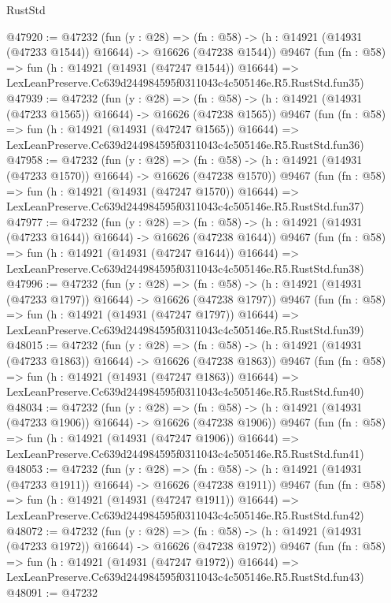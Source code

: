 \begin{lexlean}{RustStd}
\begin{coremodule}
@47920 := @47232
    (fun (y : @28) =>
    (fn : @58) -> (h : @14921 (@14931 (@47233 @1544)) @16644) -> @16626 (@47238 @1544))
    @9467
    (fun (fn : @58) =>
    fun (h : @14921 (@14931 (@47247 @1544)) @16644) =>
    LexLeanPreserve.Cc639d244984595f0311043c4c505146e.R5.RustStd.fun35)
@47939 := @47232
    (fun (y : @28) =>
    (fn : @58) -> (h : @14921 (@14931 (@47233 @1565)) @16644) -> @16626 (@47238 @1565))
    @9467
    (fun (fn : @58) =>
    fun (h : @14921 (@14931 (@47247 @1565)) @16644) =>
    LexLeanPreserve.Cc639d244984595f0311043c4c505146e.R5.RustStd.fun36)
@47958 := @47232
    (fun (y : @28) =>
    (fn : @58) -> (h : @14921 (@14931 (@47233 @1570)) @16644) -> @16626 (@47238 @1570))
    @9467
    (fun (fn : @58) =>
    fun (h : @14921 (@14931 (@47247 @1570)) @16644) =>
    LexLeanPreserve.Cc639d244984595f0311043c4c505146e.R5.RustStd.fun37)
@47977 := @47232
    (fun (y : @28) =>
    (fn : @58) -> (h : @14921 (@14931 (@47233 @1644)) @16644) -> @16626 (@47238 @1644))
    @9467
    (fun (fn : @58) =>
    fun (h : @14921 (@14931 (@47247 @1644)) @16644) =>
    LexLeanPreserve.Cc639d244984595f0311043c4c505146e.R5.RustStd.fun38)
@47996 := @47232
    (fun (y : @28) =>
    (fn : @58) -> (h : @14921 (@14931 (@47233 @1797)) @16644) -> @16626 (@47238 @1797))
    @9467
    (fun (fn : @58) =>
    fun (h : @14921 (@14931 (@47247 @1797)) @16644) =>
    LexLeanPreserve.Cc639d244984595f0311043c4c505146e.R5.RustStd.fun39)
@48015 := @47232
    (fun (y : @28) =>
    (fn : @58) -> (h : @14921 (@14931 (@47233 @1863)) @16644) -> @16626 (@47238 @1863))
    @9467
    (fun (fn : @58) =>
    fun (h : @14921 (@14931 (@47247 @1863)) @16644) =>
    LexLeanPreserve.Cc639d244984595f0311043c4c505146e.R5.RustStd.fun40)
@48034 := @47232
    (fun (y : @28) =>
    (fn : @58) -> (h : @14921 (@14931 (@47233 @1906)) @16644) -> @16626 (@47238 @1906))
    @9467
    (fun (fn : @58) =>
    fun (h : @14921 (@14931 (@47247 @1906)) @16644) =>
    LexLeanPreserve.Cc639d244984595f0311043c4c505146e.R5.RustStd.fun41)
@48053 := @47232
    (fun (y : @28) =>
    (fn : @58) -> (h : @14921 (@14931 (@47233 @1911)) @16644) -> @16626 (@47238 @1911))
    @9467
    (fun (fn : @58) =>
    fun (h : @14921 (@14931 (@47247 @1911)) @16644) =>
    LexLeanPreserve.Cc639d244984595f0311043c4c505146e.R5.RustStd.fun42)
@48072 := @47232
    (fun (y : @28) =>
    (fn : @58) -> (h : @14921 (@14931 (@47233 @1972)) @16644) -> @16626 (@47238 @1972))
    @9467
    (fun (fn : @58) =>
    fun (h : @14921 (@14931 (@47247 @1972)) @16644) =>
    LexLeanPreserve.Cc639d244984595f0311043c4c505146e.R5.RustStd.fun43)
@48091 := @47232

\end{coremodule}
\end{lexlean}
